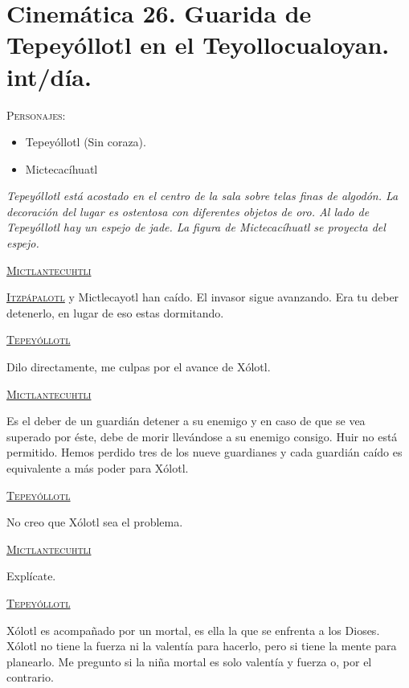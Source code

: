 \section{Cinemática 26. Guarida de Tepeyóllotl en el Teyollocualoyan. int/día.}  \label{Cin:Cinematica26}
 \textsc{Personajes}:
 \begin{itemize}
 \item Tepeyóllotl (Sin coraza).
\item Mictecacíhuatl
 \end{itemize}
\textit{Tepeyóllotl está acostado en el centro de la sala sobre telas finas de algodón. La decoración del lugar es ostentosa con diferentes objetos de oro. Al lado de Tepeyóllotl hay un espejo de jade. La figura de   Mictecacíhuatl se proyecta del espejo.}
\begin{center}
\textsc{\underline{Mictlantecuhtli}}
\\
\par
\textsc{\underline{Itzpápalotl}} y Mictlecayotl han caído. El invasor sigue avanzando. Era tu deber detenerlo, en lugar de eso estas dormitando.
\\
\par
\textsc{\underline{Tepeyóllotl}}
\\
\par
Dilo directamente, me culpas por el avance de Xólotl.
\\
\par
\textsc{\underline{Mictlantecuhtli}}
\\
\par
Es el deber de un guardián detener a su enemigo y en caso de que se vea superado por éste, debe de morir llevándose a su enemigo consigo. Huir no está permitido. Hemos perdido tres de los nueve guardianes y cada guardián caído es equivalente a más poder para Xólotl.
\\
\par
\textsc{\underline{Tepeyóllotl}}
\\
\par
No creo que Xólotl sea el problema.
\\
\par
\textsc{\underline{Mictlantecuhtli}}
\\
\par
Explícate.
\\
\par
\textsc{\underline{Tepeyóllotl}}
\\
\par
Xólotl es acompañado por un mortal, es ella la que se enfrenta a los Dioses. Xólotl no tiene la fuerza ni la valentía para hacerlo, pero si tiene la mente para planearlo. Me pregunto si la niña mortal es solo valentía y fuerza o, por el contrario.

\end{center}
